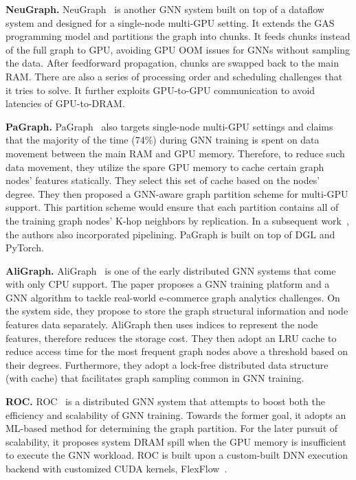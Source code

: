 \vspace{2mm}
\noindent \textbf{NeuGraph.}
NeuGraph~\cite{neugraph} is another GNN system built on top of a dataflow system and designed for a single-node multi-GPU setting. It extends the GAS~\cite{powergraph} programming model and partitions the graph into chunks. It feeds chunks instead of the full graph to GPU, avoiding GPU OOM issues for GNNs without sampling the data. After feedforward propagation, chunks are swapped back to the main RAM. There are also a series of processing order and scheduling challenges that it tries to solve. It further exploits GPU-to-GPU communication to avoid latencies of GPU-to-DRAM. 

\vspace{2mm}
\noindent \textbf{PaGraph.}
PaGraph~\cite{pagraph, pagraph2} also targets single-node multi-GPU settings and claims that the majority of the time (74\%) during GNN training is spent on data movement between the main RAM and GPU memory. Therefore, to reduce such data movement, they utilize the spare GPU memory to cache certain graph nodes' features statically. They select this set of cache based on the nodes' degree. They then proposed a GNN-aware graph partition scheme for multi-GPU support. This partition scheme would ensure that each partition contains all of the training graph nodes' K-hop neighbors by replication. In a subsequent work~\cite{pagraph2}, the authors also incorporated pipelining. PaGraph is built on top of DGL and PyTorch.

\vspace{2mm}
\noindent \textbf{AliGraph.} 
AliGraph~\cite{aligraph} is one of the early distributed GNN systems that come with only CPU support. The paper proposes a GNN training platform and a GNN algorithm to tackle real-world e-commerce graph analytics challenges. On the system side, they propose to store the graph structural information and node features data separately. AliGraph then uses indices to represent the node features, therefore reduces the storage cost. They then adopt an LRU cache to reduce access time for the most frequent graph nodes above a threshold based on their degrees. Furthermore, they adopt a lock-free distributed data structure (with cache) that facilitates graph sampling common in GNN training.

\vspace{2mm}
\noindent \textbf{ROC.} 
ROC~\cite{roc} is a distributed GNN system that attempts to boost both the efficiency and scalability of GNN training. Towards the former goal, it adopts an ML-based method for determining the graph partition. For the later pursuit of scalability, it proposes system DRAM spill when the GPU memory is insufficient to execute the GNN workload. ROC is built upon a custom-built DNN execution backend with customized CUDA kernels, FlexFlow~\cite{flexflow}.


